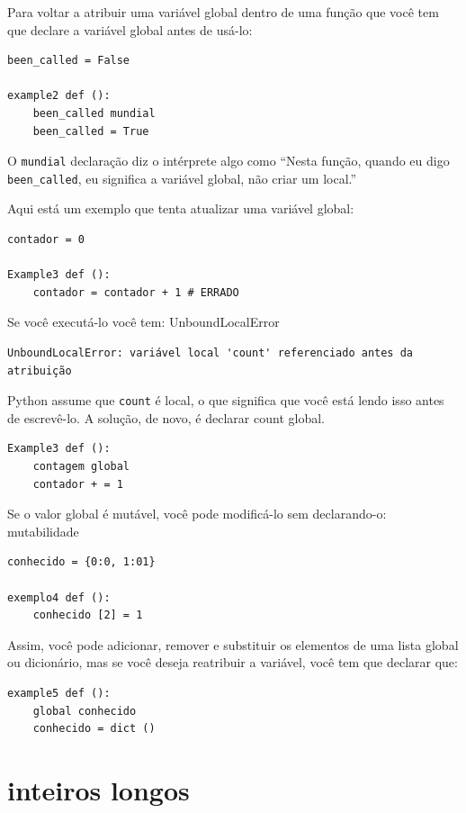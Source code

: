 \documentclass[10pt]{book}
\begin{document}
\begin{exercise}
\begin{v erbatim}
Para voltar a atribuir uma variável global dentro de uma função que você tem que
{\bf} declare a variável global antes de usá-lo:

\begin{verbatim}
been_called = False

example2 def ():
    been_called mundial 
    been_called = True
\end{verbatim}
%
O {\tt mundial} declaração diz o intérprete
algo como ``Nesta função, quando eu digo \verb "been_called", eu
significa a variável global, não criar um local.''

Aqui está um exemplo que tenta atualizar uma variável global:

\begin{verbatim}
contador = 0

Example3 def ():
    contador = contador + 1 # ERRADO
\end{verbatim}
%
Se você executá-lo você tem:
\index{} UnboundLocalError

\begin{verbatim}
UnboundLocalError: variável local 'count' referenciado antes da atribuição
\end{verbatim}
%
Python assume que {\tt count} é local, o que significa
que você está lendo isso antes de escrevê-lo. A solução, de novo,
é declarar {count \tt} global.

\begin{verbatim}
Example3 def ():
    contagem global
    contador + = 1
\end{verbatim}
%
Se o valor global é mutável, você pode modificá-lo sem
declarando-o:
\index{} mutabilidade

\begin{verbatim}
conhecido = {0:0, 1:01}

exemplo4 def ():
    conhecido [2] = 1
\end{verbatim}
%
Assim, você pode adicionar, remover e substituir os elementos de uma lista global ou
dicionário, mas se você deseja reatribuir a variável, você
tem que declarar que:

\begin{verbatim}
example5 def ():
    global conhecido
    conhecido = dict ()
\end{verbatim}
%

\section{inteiros longos}


\end{v erbatim}
\end{exercise}
\end{document}
